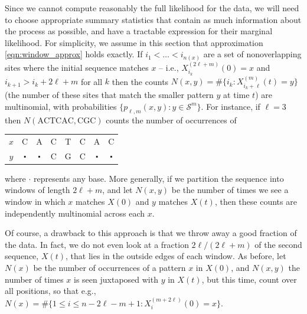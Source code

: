 \documentclass{article}
\newcommand{\calS}{\mathcal{S}}  %
\newcommand{\st}{\colon}  %
\theoremstyle{plain}
\theoremstyle{definition}
\begin{document}
Since we cannot compute reasonably the full likelihood for the data,
we will need to choose appropriate summary statistics
that contain as much information about the process as possible,
and have a tractable expression for their marginal likelihood.
For simplicity,
we assume in this section that approximation \eqref{eqn:window_approx} holds exactly.
If $i_1 < \ldots < i_{n(x)}$ are a set of nonoverlapping sites where the initial sequence matches $x$
-- i.e., $X_{i_k}^{(2\ell+m)}(0)=x$ and $i_{k+1} > i_k + 2\ell+m$ for all $k$ %
then the counts $N(x,y)=\#\{ i_k \st X_{i_k+\ell}^{(m)}(t)=y\}$ (the number of these sites that match the smaller pattern $y$ at time $t$)
are multinomial, with probabilities $\{p_{\ell,m}(x,y)\st y \in \calS^m\}$.
For instance, if $\ell=3$ then $N(\text{ACTCAC}, \text{CGC})$ counts the number of occurrences of
\begin{center}
\begin{tabular}{c|ccccccc}
 $x$ &  C  & A & C & T & C & A & C \\
 $y$ &  $\centerdot$  & $\centerdot$  & C & G & C & $\centerdot$  & $\centerdot$
\end{tabular}
\end{center}
where $\cdot$ represents any base.
More generally, if we partition the sequence into windows of length $2\ell+m$,
and let $N(x,y)$ be the number of times we see a window in which $x$ matches $X(0)$ and $y$ matches $X(t)$,
then these counts are independently multinomial across each $x$.

Of course, a drawback to this approach is that we throw away a good fraction of the data.
In fact, we do not even look at a fraction $2\ell/(2\ell+m)$ of the second sequence, $X(t)$,
that lies in the outside edges of each window.
As before, let $N(x)$ be the number of occurrences of a pattern $x$ in $X(0)$,
and $N(x,y)$ the number of times $x$ is seen juxtaposed with $y$ in $X(t)$,
but this time, count over all positions,
so that e.g., $N(x) = \#\{ 1 \le i \le n - 2\ell - m + 1 \st X_i^{(m+2\ell)}(0)=x\}$.
\end{document}

